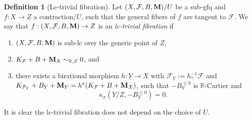 \documentclass[11pt]{amsart}
\numberwithin{equation}{section}
\newcommand{\Mm}{{\bf{M}}}
\newcommand{\Rr}{\mathbb{R}}
\newcommand{\Ff}{\mathcal{F}}
\theoremstyle{definition}
\newtheorem{defn}[thm]{Definition}
\theoremstyle{definition}
\theoremstyle{definition}
\begin{document}
\begin{defn}[Lc-trivial fibration]\label{defn: lc trivial fibration gfq}
Let $(X,\Ff,B,\Mm)/U$ be a sub-gfq and $f: X\rightarrow Z$ a contraction$/U$, such that the general fibers of $f$ are tangent to $\Ff$. We say that $f: (X,\Ff,B,\Mm)\rightarrow Z$ is an \emph{lc-trivial fibration} if
\begin{enumerate}
\item $(X,\Ff,B,\Mm)$ is sub-lc over the generic point of $Z$,  
\item $K_{\Ff}+B+\Mm_X\sim_{\mathbb R,Z}0$, and
\item there exists a birational morphism $h: Y\rightarrow X$ with $\Ff_Y:=h^{-1}_*\Ff$ and $K_{\Ff_Y}+B_Y+\Mm_Y=h^*(K_{\Ff}+B+\Mm_X)$, such that $-B_Y^{\leq 0}$ is $\Rr$-Cartier and 
$$\kappa_{\sigma}(Y/Z,-B_Y^{\leq 0})=0.$$
\end{enumerate}
It is clear the lc-trivial fibration does not depend on the choice of $U$.
\end{defn}
\end{document}
